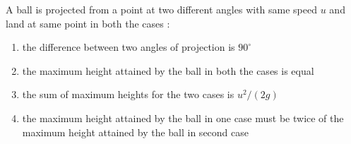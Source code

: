 \item A ball is projected from a point at two different angles with same speed $u$ and land at same point in both the cases :
\begin{enumerate}
\item the difference between two angles of projection is $90^\circ$
\item the maximum height attained by the ball in both the cases is equal
\item the sum of maximum heights for the two cases is $u^2/(2g)$\ans
\item the maximum height attained by the ball in one case must be twice of the maximum height attained by the ball in second case
\end{enumerate}